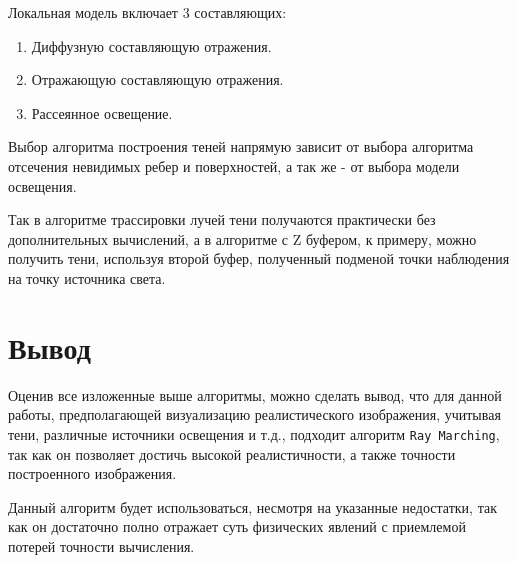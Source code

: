 Локальная модель включает 3 составляющих:
\begin{enumerate}
	\item Диффузную составляющую отражения.
	\item Отражающую составляющую отражения.
	\item Рассеянное освещение.
\end{enumerate}

Выбор алгоритма построения теней напрямую зависит от выбора алгоритма отсечения невидимых ребер и поверхностей, а так же - от выбора модели освещения. 

Так в алгоритме трассировки лучей тени получаются практически без дополнительных вычислений, а в алгоритме с Z буфером, к примеру, можно получить тени, используя второй буфер, полученный подменой точки наблюдения на точку источника света. 

\section{Вывод}

Оценив все изложенные выше алгоритмы, можно сделать вывод, что для данной работы, предполагающей визуализацию реалистического изображения, учитывая тени, различные источники освещения и т.д., подходит алгоритм \texttt{Ray Marching}, так как он позволяет достичь высокой реалистичности, а также точности построенного изображения.

Данный алгоритм будет использоваться, несмотря на указанные недостатки, так как он достаточно полно отражает суть физических явлений с приемлемой потерей точности вычисления.


